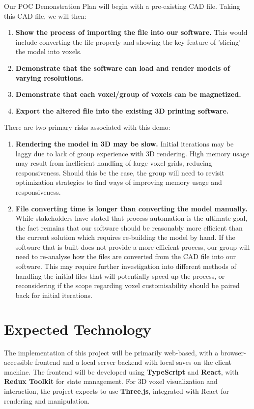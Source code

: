 \documentclass{article}
\begin{document}
Our POC Demonstration Plan will begin with a pre-existing CAD file. Taking this 
CAD file, we will then:

\begin{enumerate}
  \item \textbf{Show the process of importing the file into our software.} This would include converting the file properly and showing the key feature of 'slicing' the model into voxels.
  \item \textbf{Demonstrate that the software can load and render models of varying resolutions.}
  \item \textbf{Demonstrate that each voxel/group of voxels can be magnetized.}
  \item \textbf{Export the altered file into the existing 3D printing software.}
\end{enumerate}

There are two primary risks associated with this demo:

\begin{enumerate}
  \item \textbf{Rendering the model in 3D may be slow.} Initial iterations may be laggy due to lack of group experience with 3D rendering. High memory usage may result from inefficient handling of large voxel grids, reducing responsiveness. Should this be the case, the group will need to revisit optimization strategies to find ways of improving memory usage and responsiveness.
  \item \textbf{File converting time is longer than converting the model manually.} While stakeholders have stated that process automation is the ultimate goal, the fact remains that our software should be reasonably more efficient than the current solution which requires re-building the model by hand. If the software that is built does not provide a more efficient process, our group will need to re-analyse how the files are converted from the CAD file into our software. This may require further investigation into different methods of handling the initial files that will potentially speed up the process, or reconsidering if the scope regarding voxel customisability should be paired back for initial iterations.
\end{enumerate}

\section{Expected Technology}

The implementation of this project will be primarily web-based, with a
browser-accessible frontend and a local server backend with local saves on the client machine. The frontend will be
developed using \textbf{TypeScript} and \textbf{React}, with
\textbf{Redux Toolkit} for state management. For 3D voxel visualization and
interaction, the project expects to use \textbf{Three.js}, integrated with
React for rendering and manipulation.
\end{document}
